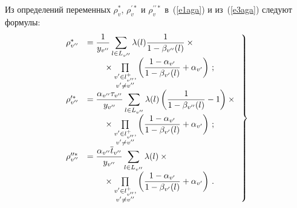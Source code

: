 \begin{multicols}{2}
     Из определений переменных $\rho_v^*$, $\rho_v^{\prime *}$ и
$\rho_v^{\prime\prime *}$ в~(\ref{e1aga}) и из~(\ref{e3aga}) следуют 
формулы:
     \begin{equation}
     \left.
    \hspace*{-2mm} \begin{array}{rl}
     \rho^*_{v^{\prime\prime}} &=\fr{1}{y_{ v^{\prime\prime}}}\sum\limits_{l 
\in L_{ v^{\prime\prime}} } \lambda(l) \fr{1}{1-\beta_{ v^{\prime\prime}}(l)}\times{}\\[9pt]
&\hspace*{7mm}{}\times
     \prod\limits_{\substack{{v^\prime\in l_{ v^{\prime\prime}}^+,}\\{v^\prime 
\not=v^{\prime\prime}}}}\left( 
     \fr{1-\alpha_{v^\prime}}{1-
\beta_{v^\prime}(l)}+\alpha_{v^\prime}\right)\,;\\[9pt]
 \rho^{\prime *}_{ v^{\prime\prime}}&=\fr{\alpha_{ 
v^{\prime\prime}}\tau_{ v^{\prime\prime}}}{y_{ 
v^{\prime\prime}}}\sum\limits_{l\in L_{ v^{\prime\prime}}}
     \lambda(l) \left( \fr{1}{1-\beta_{ v^{\prime\prime}}(l)}-1\right) \times{}\\[9pt]
&    \hspace*{7mm}{}\times
\prod\limits_{\substack{{v^\prime\in l^+_{ v^{\prime\prime}},}\\ 
{v^\prime\not=v^{\prime\prime}}}}
     \left(\fr{1-\alpha_{v^\prime}}{1-
\beta_{v^\prime}(l)}+\alpha_{v^\prime}\right)\,;\\[9pt]
     \rho_{ v^{\prime\prime}}^{\prime\prime *} &= \fr{\alpha_{ 
v^{\prime\prime}} \overline{t}_{ v^{\prime\prime}}}
{y_{v^{\prime\prime}}}\sum\limits_{l\in L_{ v^{\prime\prime}}}\lambda(l) \times{}\\[9pt]
&\hspace*{7mm}{}\times
\prod\limits_{\substack{{v^\prime\in l^+_{ v^{\prime\prime}},}\\ {v^\prime\not=v^{\prime\prime}}}}\left( \fr{1-\alpha_{v^\prime}}{1-
\beta_{v^\prime}(l)}+\alpha_{v^\prime}\right)\,.
\end{array}
\right\}
\label{e12aga}
\end{equation}
   

\end{multicols}
